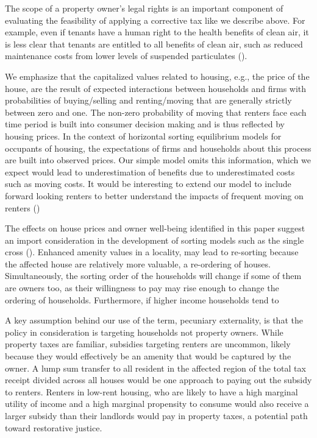 \documentclass[ecta,nameyear,draft]{econsocart}
\theoremstyle{plain}
\theoremstyle{remark}
\begin{document}
The scope of a property owner's legal rights is an important component of evaluating the feasibility of applying a corrective tax like we describe above. For example, even if tenants have a human right to the health benefits of clean air, it is less clear that tenants are entitled to all benefits of clean air, such as reduced maintenance costs from lower levels of suspended particulates (\cite{bajari12}). 

We emphasize that the capitalized values related to housing, e.g., the price of the house, are the result of expected interactions between households and firms with probabilities of buying/selling and renting/moving that are generally strictly between zero and one. The non-zero probability of moving that renters face each time period is built into consumer decision making and is thus reflected by housing prices. In the context of horizontal sorting equilibrium models for occupants of housing, the expectations of firms and households about this process are built into observed prices. Our simple model omits this information, which we expect would lead to underestimation of benefits due to underestimated costs such as moving costs. It would be interesting to extend our model to include forward looking renters to better understand the impacts of frequent moving on renters (\cite{bishop19}) 

The effects on house prices and owner well-being identified in this paper suggest an import consideration in the development of sorting models such as the single cross (\cite{banzhaf20}). Enhanced amenity values in a locality, may lead to re-sorting because the affected house are relatively more valuable, a re-ordering of houses. Simultaneously, the sorting order of the households will change if some of them are owners too, as their willingness to pay may rise enough to change the ordering of households. Furthermore, if higher income households tend to 

A key assumption behind our use of the term, pecuniary externality, is that the policy in consideration is targeting households not property owners. While property taxes are familiar, subsidies targeting renters are uncommon, likely because they would effectively be an amenity that would be captured by the owner. A lump sum transfer to all resident in the affected region of the total tax receipt divided across all houses would be one approach to paying out the subsidy to renters. Renters in low-rent housing, who are likely to have a high marginal utility of income and a high marginal propensity to consume would also receive a larger subsidy than their landlords would pay in property taxes, a potential path toward restorative justice. 
\end{document}
